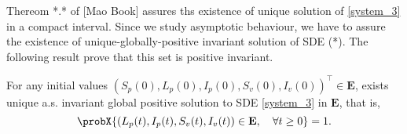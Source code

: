 Thereom *.* of [Mao Book] assures ths existence of unique solution of 
\eqref{system_3} in a compact interval. Since we study asymptotic behaviour, 
we have to assure the existence of unique-globally-positive invariant solution 
of SDE (*). The following result prove that this set is positive invariant.
%
\begin{theorem}\label{existence-unique}
	For any initial values 
	$
		(S_p(0), L_p(0), I_p(0), S_v(0), I_v(0))^{\top}
		\in \mathbf{E}
	$, 
	exists unique a.s. invariant global positive solution to SDE 
	\eqref{system_3} in $\mathbf{E}$, that is,
	\begin{equation*}
		\probX{
			(L_p(t), I_p(t), S_v(t), I_v(t)) 
			\in 
			\mathbf{E}, \quad
			\forall t \geq 0
		} = 1.
	\end{equation*}
\end{theorem}
%
